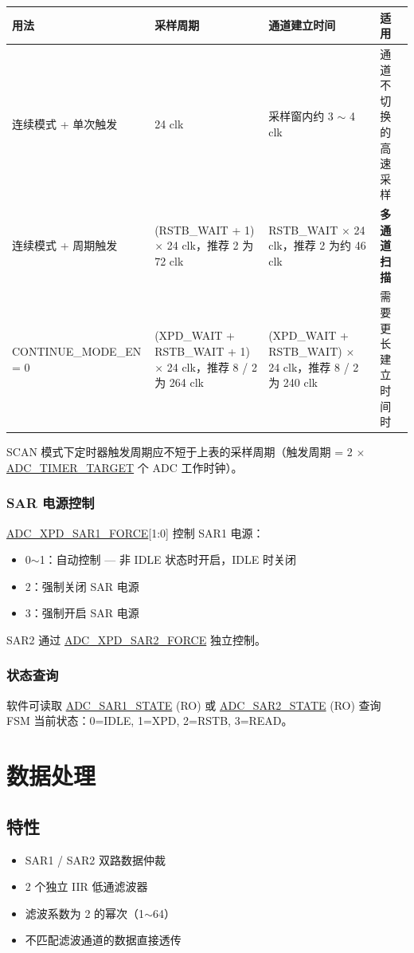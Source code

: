 \documentclass[main\_\_CN.tex]{subfiles}
\begin{document}
{\small
\begin{center}
\begin{tabular}{|l|p{2.5cm}|p{2.5cm}|p{3.2cm}|}
    \hline
    \rowcolor{lightgray}
    用法 & 采样周期 & 通道建立时间 & 适用 \\\hline
    连续模式 + 单次触发 & 24 clk & 采样窗内约 3 $\sim$ 4 clk & 通道不切换的高速采样 \\\hline
    连续模式 + 周期触发 & (RSTB\_WAIT + 1) $\times$ 24 clk，推荐 2 为 72 clk & RSTB\_WAIT $\times$ 24 clk，推荐 2 为约 46 clk & \textbf{多通道扫描} \\\hline
    CONTINUE\_MODE\_EN = 0 & (XPD\_WAIT + RSTB\_WAIT + 1) $\times$ 24 clk，推荐 8 / 2 为 264 clk & (XPD\_WAIT + RSTB\_WAIT) $\times$ 24 clk，推荐 8 / 2 为 240 clk & 需要更长建立时间时 \\\hline
\end{tabular}
\end{center}
}

SCAN 模式下定时器触发周期应不短于上表的采样周期（触发周期 = 2 $\times$ \hyperref[fielddesc:ADCTIMERTARGET]{ADC\_TIMER\_TARGET} 个 ADC 工作时钟）。

\subsubsection{SAR 电源控制}
\hyperref[fielddesc:ADCXPDSAR1FORCE]{ADC\_XPD\_SAR1\_FORCE}[1:0] 控制 SAR1 电源：
\begin{itemize}
    \item 0$\sim$1：自动控制 — 非 IDLE 状态时开启，IDLE 时关闭
    \item 2：强制关闭 SAR 电源
    \item 3：强制开启 SAR 电源
\end{itemize}
SAR2 通过 \hyperref[fielddesc:ADCXPDSAR2FORCE]{ADC\_XPD\_SAR2\_FORCE} 独立控制。

\subsubsection{状态查询}
软件可读取 \hyperref[fielddesc:ADCSAR1STATE]{ADC\_SAR1\_STATE} (RO) 或 \hyperref[fielddesc:ADCSAR2STATE]{ADC\_SAR2\_STATE} (RO) 查询 FSM 当前状态：0=IDLE, 1=XPD, 2=RSTB, 3=READ。


\section{数据处理}
\label{sec:adc-datapath}

\subsection{特性}
\begin{itemize}
    \item SAR1 / SAR2 双路数据仲裁
    \item 2 个独立 IIR 低通滤波器
    \item 滤波系数为 2 的幂次（1$\sim$64）
    \item 不匹配滤波通道的数据直接透传 
\end{itemize}
\end{document}
